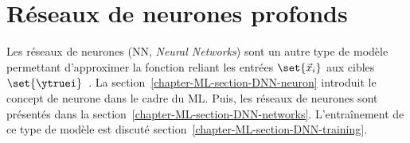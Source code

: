 \section{Réseaux de neurones profonds}\label{chapter-ML-section-DNN}
Les réseaux de neurones (NN, \emph{Neural Networks}) sont un autre type de modèle permettant d'approximer la fonction reliant les entrées $\set{\vec{x}_i}$ aux cibles $\set{\ytruei}$~\cite{DNN}.
La section~\ref{chapter-ML-section-DNN-neuron} introduit le concept de neurone dans le cadre du ML.
Puis, les réseaux de neurones sont présentés dans la section~\ref{chapter-ML-section-DNN-networks}.
L'entraînement de ce type de modèle est discuté section~\ref{chapter-ML-section-DNN-training}.



